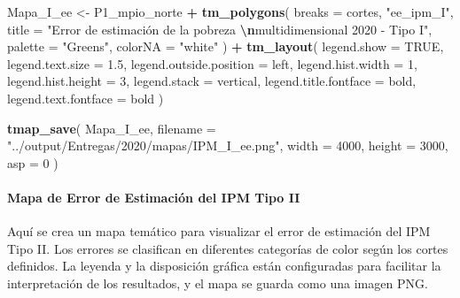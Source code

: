 \documentclass[
  12pt,
]{book}
\newenvironment{Shaded}{\begin{snugshade}}{\end{snugshade}}
\newcommand{\AttributeTok}[1]{\textcolor[rgb]{0.13,0.29,0.53}{#1}}
\newcommand{\ConstantTok}[1]{\textcolor[rgb]{0.56,0.35,0.01}{#1}}
\newcommand{\DecValTok}[1]{\textcolor[rgb]{0.00,0.00,0.81}{#1}}
\newcommand{\FloatTok}[1]{\textcolor[rgb]{0.00,0.00,0.81}{#1}}
\newcommand{\FunctionTok}[1]{\textcolor[rgb]{0.13,0.29,0.53}{\textbf{#1}}}
\newcommand{\NormalTok}[1]{#1}
\newcommand{\OtherTok}[1]{\textcolor[rgb]{0.56,0.35,0.01}{#1}}
\newcommand{\SpecialCharTok}[1]{\textcolor[rgb]{0.81,0.36,0.00}{\textbf{#1}}}
\newcommand{\StringTok}[1]{\textcolor[rgb]{0.31,0.60,0.02}{#1}}
\begin{document}
\begin{Shaded}
\begin{Highlighting}[]
\NormalTok{Mapa\_I\_ee }\OtherTok{\textless{}{-}}
\NormalTok{  P1\_mpio\_norte }\SpecialCharTok{+} \FunctionTok{tm\_polygons}\NormalTok{(}
    \AttributeTok{breaks =}\NormalTok{ cortes,}
    \StringTok{"ee\_ipm\_I"}\NormalTok{,}
    \AttributeTok{title =} \StringTok{"Error de estimación de la pobreza }\SpecialCharTok{\textbackslash{}n}\StringTok{multidimensional 2020 {-} Tipo I"}\NormalTok{,}
    \AttributeTok{palette =} \StringTok{"Greens"}\NormalTok{,}
    \AttributeTok{colorNA =} \StringTok{"white"}
\NormalTok{  ) }\SpecialCharTok{+} \FunctionTok{tm\_layout}\NormalTok{(}
    \AttributeTok{legend.show =} \ConstantTok{TRUE}\NormalTok{,}
    \AttributeTok{legend.text.size =} \FloatTok{1.5}\NormalTok{,}
    \AttributeTok{legend.outside.position =} \StringTok{\textquotesingle{}left\textquotesingle{}}\NormalTok{,}
    \AttributeTok{legend.hist.width =} \DecValTok{1}\NormalTok{,}
    \AttributeTok{legend.hist.height =} \DecValTok{3}\NormalTok{,}
    \AttributeTok{legend.stack =} \StringTok{\textquotesingle{}vertical\textquotesingle{}}\NormalTok{,}
    \AttributeTok{legend.title.fontface =} \StringTok{\textquotesingle{}bold\textquotesingle{}}\NormalTok{,}
    \AttributeTok{legend.text.fontface =} \StringTok{\textquotesingle{}bold\textquotesingle{}}
\NormalTok{  )}

\FunctionTok{tmap\_save}\NormalTok{(}
\NormalTok{  Mapa\_I\_ee,}
  \AttributeTok{filename =} \StringTok{"../output/Entregas/2020/mapas/IPM\_I\_ee.png"}\NormalTok{,}
  \AttributeTok{width =} \DecValTok{4000}\NormalTok{,}
  \AttributeTok{height =} \DecValTok{3000}\NormalTok{,}
  \AttributeTok{asp =} \DecValTok{0}
\NormalTok{)}
\end{Highlighting}
\end{Shaded}

\hypertarget{mapa-de-error-de-estimaciuxf3n-del-ipm-tipo-ii}{%
\paragraph*{Mapa de Error de Estimación del IPM Tipo II}\label{mapa-de-error-de-estimaciuxf3n-del-ipm-tipo-ii}}

Aquí se crea un mapa temático para visualizar el error de estimación del IPM Tipo II. Los errores se clasifican en diferentes categorías de color según los cortes definidos. La leyenda y la disposición gráfica están configuradas para facilitar la interpretación de los resultados, y el mapa se guarda como una imagen PNG.
\end{document}
